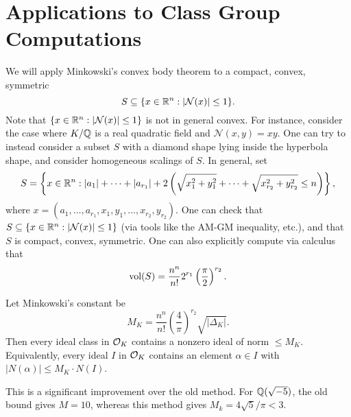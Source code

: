 \section{Applications to Class Group Computations}
\begin{remark}
  We will apply Minkowski's convex body theorem
  to a compact, convex, symmetric
  \[
    S \subseteq \{x \in \mathbb{R}^n : |\mathcal{N}(x)| \le 1\}.
  \]
  Note that $\{x \in \mathbb{R}^n : |\mathcal{N}(x)| \le 1\}$ is
  not in general convex. For instance, consider the case
  where $K / \mathbb{Q}$ is a real quadratic field and
  $\mathcal{N}(x, y) = xy$. One can try to instead
  consider a subset $S$ with a
  diamond shape lying inside the
  hyperbola shape, and consider homogeneous
  scalings of $S$. In general, set
  \[
    S = \left\{x \in \mathbb{R}^n : |a_1| + \dots + |a_{r_1}| + 2\left(\sqrt{x_1^2 + y_1^2} + \dots + \sqrt{x_{r_2}^2 + y_{r_2}^2} \le n\right)\right\},
  \]
  where $x = (a_1, \dots, a_{r_1}, x_1, y_1, \dots, x_{r_2}, y_{r_2})$.
  One can check that $S \subseteq \{x \in \mathbb{R}^n : |\mathcal{N}(x)| \le 1\}$
  (via tools like the AM-GM inequality, etc.), and
  that $S$ is compact, convex, symmetric.
  One can also explicitly compute via calculus that
  \[
    \operatorname{vol}(S) = \frac{n^n}{n!} 2^{r_1} \left(\frac{\pi}{2}\right)^{r_2}.
  \]
\end{remark}

\begin{corollary}
  Let Minkowski's constant be
  \[
    M_K = \frac{n^n}{n!} \left(\frac{4}{\pi}\right)^{r_2} \sqrt{|\Delta_K|}.
  \]
  Then every ideal class in $\mathcal{O}_K$ contains
  a nonzero ideal of norm $\le M_K$. Equivalently,
  every ideal $I$ in $\mathcal{O}_K$ contains an element
  $\alpha \in I$ with $|N(\alpha)| \le M_K \cdot N(I)$.
\end{corollary}

\begin{remark}
  This is a significant improvement over the old method.
  For $\mathbb{Q}(\sqrt{-5})$, the old bound gives
  $M = 10$, whereas this method gives
  $M_k = 4\sqrt{5} / \pi < 3$.
\end{remark}
